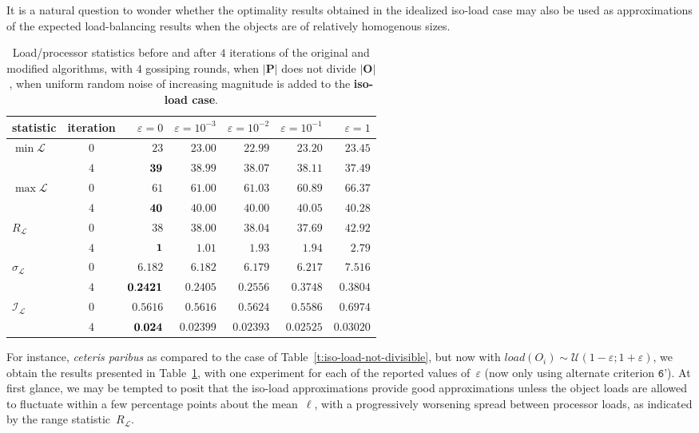 It is a natural question to wonder whether the optimality results
obtained in the idealized iso-load case may also be used as
approximations of the expected load-balancing results when the objects
are of relatively homogenous sizes.

\begin{table}[htb!]
\begin{center}
\begin{tabular}{@{}lcrrrrr@{}}
\hline
statistic & iteration
& $\varepsilon=0$
& $\varepsilon=10^{-3}$
& $\varepsilon=10^{-2}$
& $\varepsilon=10^{-1}$
& $\varepsilon=1$ \\
\hline\hline
\multirow{2}{*}{$\min{\mathcal{L}}$}
&$0$ &$23$    &$23.00$ &$22.99$ &$23.20$ &$23.45$ \\
&$4$ &$\bf39$ &$38.99$ &$38.07$ &$38.11$ &$37.49$ \\\hline
\multirow{2}{*}{$\max{\mathcal{L}}$}
&$0$ &$61$    &$61.00$ &$61.03$ &$60.89$ &$66.37$ \\
&$4$ &$\bf40$ &$40.00$ &$40.00$ &$40.05$ &$40.28$ \\\hline
\multirow{2}{*}{$R_{\mathcal{L}}$}
&$0$ &$38$    &$38.00$ &$38.04$ &$37.69$ &$42.92$ \\
&$4$ &$\bf1$  &$1.01$  &$1.93$  &$1.94$  &$2.79$  \\\hline
\multirow{2}{*}{$\sigma_{\mathcal{L}}$}
&$0$ &$6.182$     &$6.182$  &$6.179$  &$6.217$ &$7.516$ \\
&$4$ &$\bf0.2421$ &$0.2405$ &$0.2556$ &$0.3748$ &$0.3804$ \\\hline
\multirow{2}{*}{$\mathcal{I}_\mathcal{L}$}
&$0$ &$0.5616$   &$0.5616$  &$0.5624$  &$0.5586$ &$0.6974$ \\
&$4$ &$\bf0.024$ &$0.02399$ &$0.02393$ &$0.02525$ &$0.03020$ \\\hline
\end{tabular}
\end{center}
\caption{\label{t:iso-load-not-divisible-epsilon-i4}
Load/processor statistics before and after $4$ iterations of the
original and modified algorithms, with $4$ gossiping rounds, when
$\vert\mathbf{P}\vert$ does not divide $\vert\mathbf{O}\vert$, when
uniform random noise of increasing magnitude is added to the
\textbf{iso-load case}.}
\end{table}
For instance, \emph{ceteris paribus} as compared to the case
of Table~\ref{t:iso-load-not-divisible}, but now with 
$load(O_i)\sim\mathcal{U}(1-\varepsilon;1+\varepsilon)$, we obtain the
results presented in Table~\ref{t:iso-load-not-divisible-epsilon-i4},
with one experiment for each of the reported values of~$\varepsilon$
(now only using alternate criterion $\texttt{6'}$).
At first glance, we may be tempted to posit that the iso-load
approximations provide good approximations unless the object loads are
allowed to fluctuate within a few percentage points about the
mean~$\ell$, with a progressively worsening spread between processor
loads, as indicated by the range statistic~$R_{\mathcal{L}}$.

